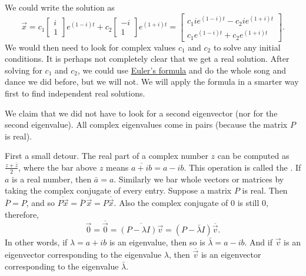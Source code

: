 We could write the solution as
\begin{equation*}
\vec{x} =
c_1 \begin{bmatrix} i \\ 1 \end{bmatrix} e^{(1-i)t} +
c_2 \begin{bmatrix} -i \\ 1 \end{bmatrix} e^{(1+i)t}
=
\begin{bmatrix}
c_1 i e^{(1-i)t} - c_2 i e^{(1+i)t} \\
c_1 e^{(1-i)t} + c_2 e^{(1+i)t}
\end{bmatrix} .
\end{equation*}
We would then need to look for complex values $c_1$ and $c_2$ to solve
any initial conditions.  It is perhaps not completely clear
that we get a real solution.  After solving for $c_1$ and $c_2$,
we could use
\hyperref[eulersformula]{Euler's formula} and do the
whole song and dance we did before, but we will not.   We will apply
the formula in a smarter way first to find independent real solutions.

\medskip

We claim that we did not have to look for a second eigenvector
(nor for the second eigenvalue).  All complex eigenvalues come in pairs
(because the matrix $P$ is real).

First a small detour.  The real part of
a complex number $z$ can be computed as $\frac{z + \bar{z}}{2}$, where
the bar above $z$ means $\overline{a+ib} = a -ib$.  This operation is called the
\emph{}.
If $a$ is a real number, then $\bar{a} = a$.
Similarly
we bar whole vectors or matrices by taking the complex conjugate
of every entry.  Suppose a matrix $P$ is real.  Then
$\overline{P} = P$, and so $\overline{P\vec{x}} = \overline{P} \,
\overline{\vec{x}} = P \overline{\vec{x}}$.
Also the complex conjugate of 0 is still 0,
therefore,
\begin{equation*}
\vec{0} = \overline{\vec{0}} = 
\overline{(P-\lambda I)\vec{v}}
=
(P-\bar{\lambda} I)\overline{\vec{v}} .
\end{equation*}
In other words, if $\lambda = a+ib$ is an eigenvalue, then so is $\bar{\lambda} = a-ib$.
And if $\vec{v}$ is an eigenvector corresponding to the eigenvalue
$\lambda$, then $\overline{\vec{v}}$ is an eigenvector corresponding
to the eigenvalue $\bar{\lambda}$.  


